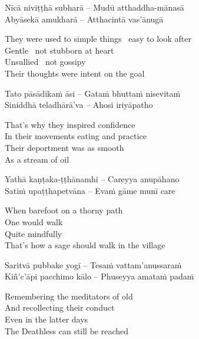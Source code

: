 \begin{verses}
  Nīcā niviṭṭhā subharā – Mudū atthaddha-mānasā\\
  Abyāsekā amukharā – Atthacintā vas'ānugā
\end{verses}

\begin{english-verses}
  They were used to simple things \breathmark\ easy to look after\\
  Gentle \breathmark\ not stubborn at heart\\
  Unsullied \breathmark\ not gossipy\\
  Their thoughts were intent on the goal
\end{english-verses}

\begin{verses}
  Tato pāsādikaṁ āsi – Gataṁ bhuttaṁ nisevitaṁ\\
  Siniddhā teladhārā'va – Ahosi iriyāpatho
\end{verses}

\begin{english-verses}
  That's why they inspired confidence\\
  In their movements eating and practice\\
  Their deportment was as smooth\\
  As a stream of oil
\end{english-verses}

\begin{verses}
  Yathā kaṇṭaka-ṭṭhānamhi – Careyya anupāhano\\
  Satiṁ upaṭṭhapetvāna – Evaṁ gāme munī care
\end{verses}

\begin{english-verses}
  When barefoot on a thorny path\\
  One would walk\\
  Quite mindfully\\
  That's how a sage should walk in the village
\end{english-verses}

\begin{verses}
  Saritvā pubbake yogī – Tesaṁ vattam'anussaraṁ\\
  Kiñ'c'āpi pacchimo kālo – Phuseyya amataṁ padaṁ
\end{verses}

\begin{english-verses}
  Remembering the meditators of old\\
  And recollecting their conduct\\
  Even in the latter days\\
  The Deathless can still be reached
\end{english-verses}


